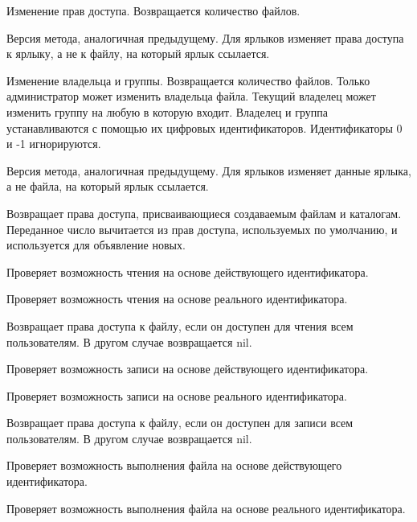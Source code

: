 \begin{methodlist}
  Изменение прав доступа. Возвращается количество файлов. 

  Версия метода, аналогичная предыдущему. Для ярлыков изменяет права доступа к ярлыку, а не к файлу, на который ярлык ссылается. 

  Изменение владельца и группы. Возвращается количество файлов. Только администратор может изменить владельца файла. Текущий владелец может изменить группу на любую в которую входит. Владелец и группа устанавливаются с помощью их цифровых идентификаторов. Идентификаторы 0 и -1 игнорируются. 

  Версия метода, аналогичная предыдущему. Для ярлыков изменяет данные ярлыка, а не файла, на который ярлык ссылается. 
 
  Возвращает права доступа, присваивающиеся создаваемым файлам и каталогам. Переданное число вычитается из прав доступа, используемых по умолчанию, и используется для объявление новых. 
  
  Проверяет возможность чтения на основе действующего идентификатора. 

  Проверяет возможность чтения на основе реального идентификатора.

  Возвращает права доступа к файлу, если он доступен для чтения всем пользователям. В другом случае возвращается nil. 

  Проверяет возможность записи на основе действующего идентификатора. 

  Проверяет возможность записи на основе реального идентификатора. 

  Возвращает права доступа к файлу, если он доступен для записи всем пользователям. В другом случае возвращается nil. 

  Проверяет возможность выполнения файла на основе действующего идентификатора.

  Проверяет возможность выполнения файла на основе реального идентификатора.


\end{methodlist}

